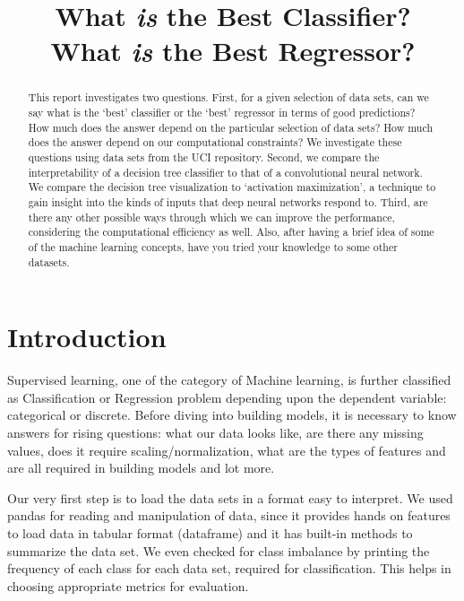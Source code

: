 \documentclass[10pt,twocolumn,letterpaper]{article}
\begin{document}
\title{What {\em is} the Best Classifier?\\
       What {\em is} the Best Regressor?}

\maketitle

\begin{abstract}
   This report investigates two questions.
   First, for a given selection of data sets, can we say what
   is the `best' classifier or the `best' regressor in terms
   of good predictions?
   How much does the answer depend on the particular selection of data sets?
   How much does the answer depend on our computational constraints?
   We investigate these questions using data sets from the UCI repository.
   Second, we compare the interpretability of a decision tree
   classifier to that of a convolutional neural network.
   We compare the decision tree visualization
   to `activation maximization', a technique to gain insight into
   the kinds of inputs that deep neural networks respond to.
   Third, are there any other possible ways through which we can improve the performance, considering the computational efficiency as well. 
   Also, after having a brief idea of some of the machine learning concepts, have you tried your knowledge to some other datasets.  
\end{abstract}

\section{Introduction}

Supervised learning, one of the category of Machine learning, is further classified as Classification or Regression problem depending upon the dependent variable: categorical or discrete. Before diving into building models, it is necessary to know answers for rising questions: what our data looks like, are there any missing values, does it require scaling/normalization, what are the types of features and are all required in building models and lot more.

Our very first step is to load the data sets in a format easy to interpret. We used pandas for reading and manipulation of data, since it provides hands on features to load data in tabular format (dataframe) and it has built-in methods to summarize the data set. We even checked for class imbalance by printing the frequency of each class for each data set, required for classification. This helps in choosing appropriate metrics for evaluation. 
\end{document}

